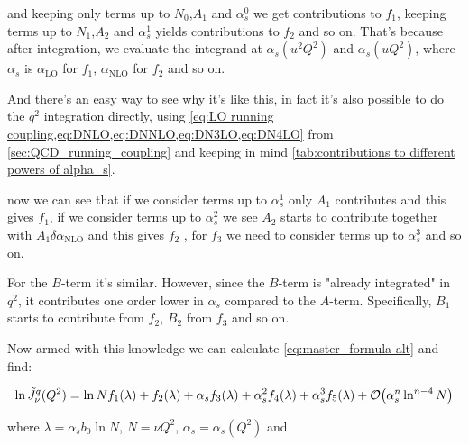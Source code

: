 \documentclass[../main.tex]{subfiles}
\begin{document}
and keeping only terms up to $N_0$,$A_1$ and $\alpha_s^0$ we get contributions to $f_1$, keeping terms up to $N_1$,$A_2$ and $\alpha_s^1$ yields contributions to $f_2$ and so on. 
That's because after integration, we evaluate the integrand at $\alpha_s(u^2 Q^2)$ and $\alpha_s(u Q^2)$, where $\alpha_s$ is $\alpha_{\text{LO}}$ for $f_1$, $\alpha_{\text{NLO}}$ for $f_2$ and so on. 

And there's an easy way to see why it's like this, in fact it's also possible to do the $q^2$ integration directly, using \cref{eq:LO running coupling,eq:DNLO,eq:DNNLO,eq:DN3LO,eq:DN4LO} from \cref{sec:QCD_running_coupling}
and keeping in mind \cref{tab:contributions to different powers of alpha_s}.


now we can see that if we consider terms up to $\alpha_s^1$ only $A_1$ contributes and this gives $f_1$, if we consider terms up to $\alpha_s^2$ we see $A_2$ starts to contribute together with $A_1  \delta\alpha_{\text{NLO}}$
and this gives $f_2$ , for $f_3$ we need to consider terms up to $\alpha_s^3$ and so on. 

For the $B$-term it's similar. However, since the $B$-term is "already integrated" in $q^2$, it contributes one order lower in $\alpha_s$ compared to the $A$-term. Specifically, $B_1$ starts to contribute from $f_2$, $B_2$ from $f_3$ and so on.  

Now armed with this knowledge we can calculate \cref{eq:master_formula alt} and find: 

\begingroup
\allowdisplaybreaks
\begin{equation}
    \ln \Tilde{J}_\nu^q(Q^2) = \ln N f_1(\lambda) + f_2(\lambda) + \alpha_s f_3(\lambda) + \alpha_s^2 f_4(\lambda) + \alpha_s^3 f_5(\lambda) + \order{\alpha_s^n \ln^{n-4}N}
\end{equation}

where $\lambda = \alpha_s b_0 \ln N$, $N=\nu Q^2$, $\alpha_s = \alpha_s(Q^2)$ and

\end{document}
